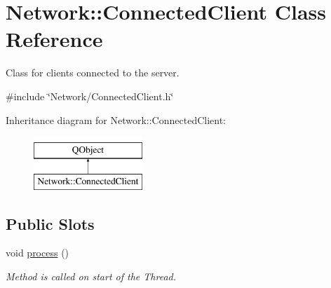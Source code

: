 \hypertarget{class_network_1_1_connected_client}{}\section{Network\+:\+:Connected\+Client Class Reference}
\label{class_network_1_1_connected_client}


Class for clients connected to the server.  




{\ttfamily \#include \char`\"{}Network/\+Connected\+Client.\+h\char`\"{}}

Inheritance diagram for Network\+:\+:Connected\+Client\+:\begin{figure}[H]
\begin{center}
\leavevmode
\includegraphics[height=2.000000cm]{class_network_1_1_connected_client}
\end{center}
\end{figure}
\subsection*{Public Slots}
\begin{DoxyCompactItemize}
\item 
void \hyperlink{class_network_1_1_connected_client_a083bda8da4cc2314027cd8b87dc8bcf4}{process} ()
\begin{DoxyCompactList}\small\item\em Method is called on start of the Thread. \end{DoxyCompactList}\end{DoxyCompactItemize}
